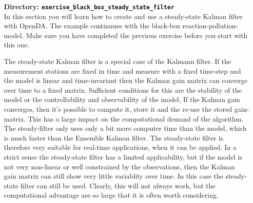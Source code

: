 {\bf Directory: {\tt exercise\_black\_box\_steady\_state\_filter}}\\

  In this section you will learn how to create and use a steady-state Kalman
  filter with OpenDA. The example continuues with the black-box reaction-pollution-model. Make sure you have completed the previous exercise before you start with this one.

  The steady-state Kalman filter is a special case of the Kalmann filter. If the measurement stations are fixed in time and measure with a fixed time-step and the model is linear and time-invariant then the Kalman gain matrix can converge over time to a fixed matrix. Sufficient conditions for this are the stability of the model or the controllability and observability of the model, If the Kalman gain converges, then it's possible to compute it, store it and the re-use the stored gain-matrix. This has a large impact on the computational demand of the algorithm. The steady-filter only uses only a bit more computer time than the model, which is much faster than the Ensemble Kalman filter. The steady-state filter is therefore very suitable for real-time applications, when it can be applied. In a strict sense the steady-state filter has a limited applicability, but if the model is not very non-linear or well constrained by the observations, then the Kalman gain matrix can still show very little variablity over time. In this case the steady-state filter can still be used. Clearly, this will not always work, but the computational advantage are so large that it is often worth considering.


